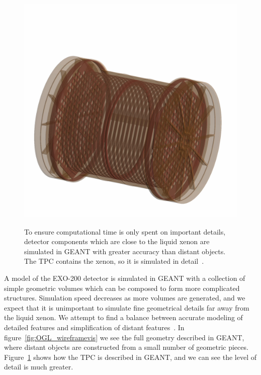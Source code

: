 \begin{figure}
\begin{center}
\includegraphics[keepaspectratio=true,width=\textwidth,clip=true,trim=20mm 30mm 35mm 125mm]{TPC_Cu_RayTracer.jpeg}
\end{center}
\renewcommand{\baselinestretch}{1}
\small\normalsize
\begin{quote}
\caption{To ensure computational time is only spent on important details, detector components which are close to the liquid xenon are simulated in GEANT with greater accuracy than distant objects.  The TPC contains the xenon, so it is simulated in detail~\cite{MCDocumentRun2a}.}
\label{fig:RayTracer_TPConly}
\end{quote}
\end{figure}
\renewcommand{\baselinestretch}{2}
\small\normalsize

A model of the EXO-200 detector is simulated in GEANT with a collection of simple geometric volumes which can be composed to form more complicated structures.  Simulation speed decreases as more volumes are generated, and we expect that it is unimportant to simulate fine geometrical details far away from the liquid xenon.  We attempt to find a balance between accurate modeling of detailed features and simplification of distant features~\cite{MCDocumentRun2a}.  In figure~\ref{fig:OGL_wireframevis} we see the full geometry described in GEANT, where distant objects are constructed from a small number of geometric pieces.  Figure~\ref{fig:RayTracer_TPConly} shows how the TPC is described in GEANT, and we can see the level of detail is much greater.

